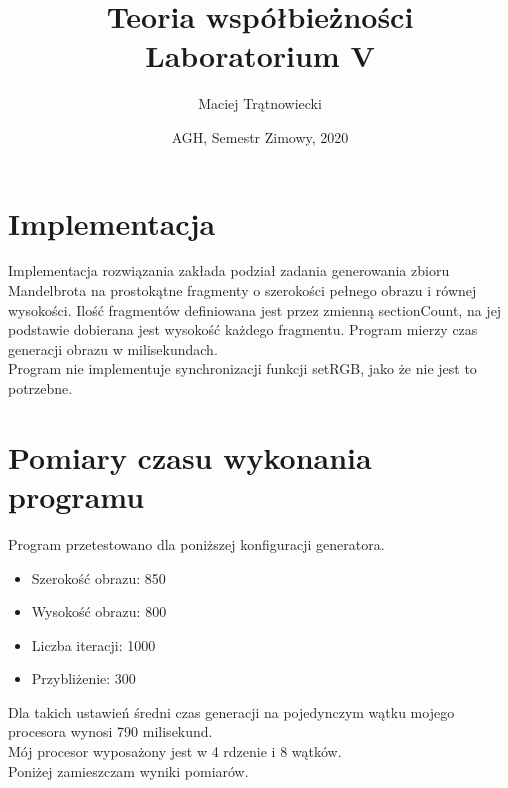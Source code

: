 \documentclass{article}
\title{Teoria współbieżności\\ 
Laboratorium V}
\author{Maciej Trątnowiecki}
\date{AGH, Semestr Zimowy, 2020}
\begin{document}
    \maketitle
    \section{Implementacja}
        Implementacja rozwiązania zakłada podział zadania generowania zbioru Mandelbrota na prostokątne fragmenty o szerokości pełnego obrazu i równej wysokości. Ilość fragmentów definiowana jest przez zmienną sectionCount, na jej podstawie dobierana jest wysokość każdego fragmentu. Program mierzy czas generacji obrazu w milisekundach.\\ 
        Program nie implementuje synchronizacji funkcji setRGB, jako że nie jest to potrzebne.
        
    \section{Pomiary czasu wykonania programu}
        Program przetestowano dla poniższej konfiguracji generatora.
        \begin{itemize}
            \item Szerokość obrazu: 850
            \item Wysokość obrazu: 800
            \item Liczba iteracji: 1000
            \item Przybliżenie: 300
        \end{itemize}
        Dla takich ustawień średni czas generacji na pojedynczym wątku mojego procesora wynosi 790 milisekund.\\
        Mój procesor wyposażony jest w 4 rdzenie i 8 wątków. \\
        Poniżej zamieszczam wyniki pomiarów. 
        
\end{document}
